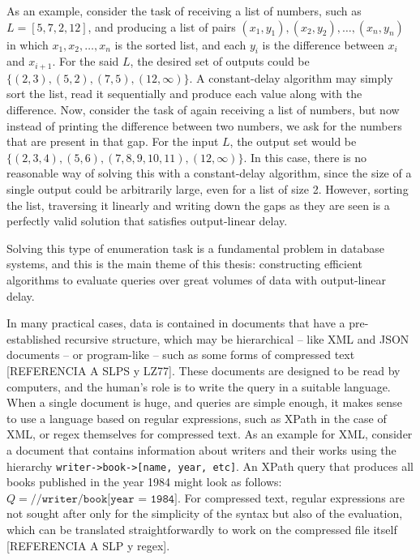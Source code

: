 As an example, consider the task of receiving a list of numbers, such as $L = [5, 7, 2, 12]$, and producing a list of pairs $(x_1,y_1),(x_2,y_2),\ldots,(x_n,y_n)$ in which $x_1,x_2,\ldots,x_n$ is the sorted list, and each $y_i$ is the difference between $x_i$ and $x_{i+1}$. For the said $L$, the desired set of outputs could be $\{(2,3), (5,2), (7,5),(12,\infty)\}$. A constant-delay algorithm may simply sort the list, read it sequentially and produce each value along with the difference. Now, consider the task of again receiving a list of numbers, but now instead of printing the difference between two numbers, we ask for the numbers that are present in that gap. For the input $L$, the output set would be $\{(2,3,4),(5,6),(7,8,9,10,11),(12,\infty)\}$. In this case, there is no reasonable way of solving this with a constant-delay algorithm, since the size of a single output could be arbitrarily large, even for a list of size 2. However, sorting the list, traversing it linearly and writing down the gaps as they are seen is a perfectly valid solution that satisfies output-linear delay.

Solving this type of enumeration task is a fundamental problem in database systems, and this is the main theme of this thesis: constructing efficient algorithms to evaluate queries over great volumes of data with output-linear delay.

In many practical cases, data is contained in documents that have a pre-established recursive structure, which may be hierarchical -- like XML and JSON documents -- or program-like -- such as some forms of compressed text [REFERENCIA A SLPS y LZ77]. These documents are designed to be read by computers, and the human's role is to write the query in a suitable language. When a single document is huge, and queries are simple enough, it makes sense to use a language based on regular expressions, such as XPath in the case of XML, or regex themselves for compressed text. As an example for XML, consider a document that contains information about writers and their works using the hierarchy {\tt writer->book->[name, year, etc]}. An XPath query that produces all books published in the year 1984 might look as follows: $Q = \texttt{//writer/book[year = 1984]}$. For compressed text, regular expressions are not sought after only for the simplicity of the syntax but also of the evaluation, which can be translated straightforwardly to work on the compressed file itself [REFERENCIA A SLP y regex].

